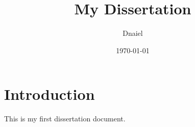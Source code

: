 \documentclass[11pt,a4paper]{article}
\title{My Dissertation}
\author{Dnaiel}
\date{\today}
\begin{document}
\maketitle

\section{Introduction}
This is my first dissertation document.
\end{document}
